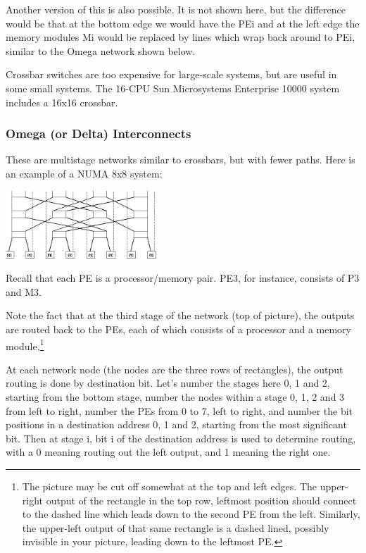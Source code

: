Another version of this is also possible. It is not shown here, but the
difference would be that at the bottom edge we would have the PEi and at
the left edge the memory modules Mi would be replaced by lines which
wrap back around to PEi, similar to the Omega network shown below.

Crossbar switches are too expensive for large-scale systems, but are
useful in some small systems. The 16-CPU Sun Microsystems Enterprise
10000 system includes a 16x16 crossbar.

\subsubsection{Omega (or Delta) Interconnects}

These are multistage networks similar to crossbars, but with fewer
paths. Here is an example of a NUMA 8x8 system:

\par

\centerline{
\includegraphics[height=1.0in]{Images/Omega.jpg} 
}

Recall that each PE is a processor/memory pair.  PE3, for instance,
consists of P3 and M3.

Note the fact that at the third stage of the network (top of picture),
the outputs are routed back to the PEs, each of which consists of a
processor and a memory module.\footnote{The picture may be cut off somewhat
at the top and left edges.  The upper-right output of the rectangle in
the top row, leftmost position should connect to the dashed line which
leads down to the second PE from the left.  Similarly, the upper-left
output of that same rectangle is a dashed lined, possibly invisible in
your picture, leading down to the leftmost PE.}

At each network node (the nodes are the three rows of rectangles), the
output routing is done by destination bit. Let's number the stages here
0, 1 and 2, starting from the bottom stage, number the nodes within a
stage 0, 1, 2 and 3 from left to right, number the PEs from 0 to 7, left
to right, and number the bit positions in a destination address 0, 1 and
2, starting from the most significant bit. Then at stage i, bit i of the
destination address is used to determine routing, with a 0 meaning
routing out the left output, and 1 meaning the right one.

